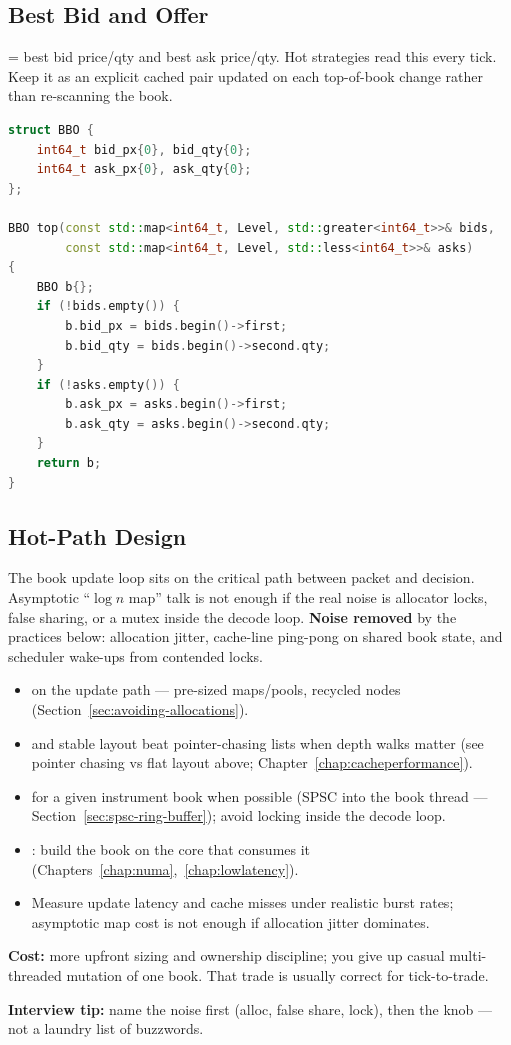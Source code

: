 \subsection{Best Bid and Offer}
\label{subsec:order-book-bbo}
 = best bid price/qty and best ask price/qty. Hot strategies read this every 
tick. Keep it as an explicit cached pair updated on each top-of-book change rather than 
re-scanning the book.
\begin{lstlisting}[language=C++]
struct BBO {
    int64_t bid_px{0}, bid_qty{0};
    int64_t ask_px{0}, ask_qty{0};
};

BBO top(const std::map<int64_t, Level, std::greater<int64_t>>& bids,
        const std::map<int64_t, Level, std::less<int64_t>>& asks)
{
    BBO b{};
    if (!bids.empty()) {
        b.bid_px = bids.begin()->first;
        b.bid_qty = bids.begin()->second.qty;
    }
    if (!asks.empty()) {
        b.ask_px = asks.begin()->first;
        b.ask_qty = asks.begin()->second.qty;
    }
    return b;
}
\end{lstlisting}

\subsection{Hot-Path Design}
\label{subsec:order-book-performance}
The book update loop sits on the critical path between packet and decision. Asymptotic 
``$\log n$ map'' talk is not enough if the real noise is allocator locks, false sharing, 
or a mutex inside the decode loop.
\newline
\textbf{Noise removed} by the practices below: allocation jitter, cache-line ping-pong on 
shared book state, and scheduler wake-ups from contended locks.
\begin{itemize}
    \item {} on the update path --- pre-sized maps/pools, recycled 
          nodes (Section~\ref{sec:avoiding-allocations}).
    \item {} and stable layout beat pointer-chasing lists when 
          depth walks matter (see pointer chasing vs flat layout above; 
          Chapter~\ref{chap:cacheperformance}).
    \item {} for a given instrument book when possible (SPSC into the 
          book thread --- Section~\ref{sec:spsc-ring-buffer}); avoid locking inside the decode 
          loop.
    \item {}: build the book on the core that consumes it 
          (Chapters~\ref{chap:numa},~\ref{chap:lowlatency}).
    \item Measure update latency and cache misses under realistic burst rates; asymptotic 
          map cost is not enough if allocation jitter dominates.
\end{itemize}
\textbf{Cost:} more upfront sizing and ownership discipline; you give up casual 
multi-threaded mutation of one book. That trade is usually correct for tick-to-trade.
\par\noindent\textbf{Interview tip:} name the noise first (alloc, false share, lock), then the 
knob --- not a laundry list of buzzwords.
